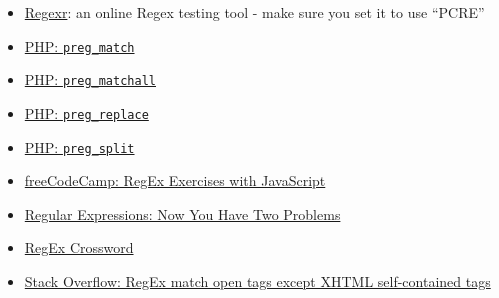 \begin{itemize}[leftmargin=*]
    \item \href{https://regexr.com}{Regexr}: an online Regex testing tool - make sure you set it to use ``PCRE''
    \item \href{http://www.php.net/manual/en/function.preg-match.php}{PHP: \texttt{preg\_match}}
    \item \href{http://www.php.net/manual/en/function.preg-match-all.php}{PHP: \texttt{preg\_matchall}}
    \item \href{http://www.php.net/manual/en/function.preg-replace.php}{PHP: \texttt{preg\_replace}}
    \item \href{http://www.php.net/manual/en/function.preg-split.php}{PHP: \texttt{preg\_split}}
    \item \href{https://www.freecodecamp.org/learn/javascript-algorithms-and-data-structures/regular-expressions/using-the-test-method}{freeCodeCamp: RegEx Exercises with JavaScript}
    \item \href{https://blog.codinghorror.com/regular-expressions-now-you-have-two-problems/}{Regular Expressions: Now You Have Two Problems}
    \item \href{http://www.regexcrossword.com/}{RegEx Crossword}
    \item \href{https://stackoverflow.com/a/1732454}{Stack Overflow: RegEx match open tags except XHTML self-contained tags}
\end{itemize}
